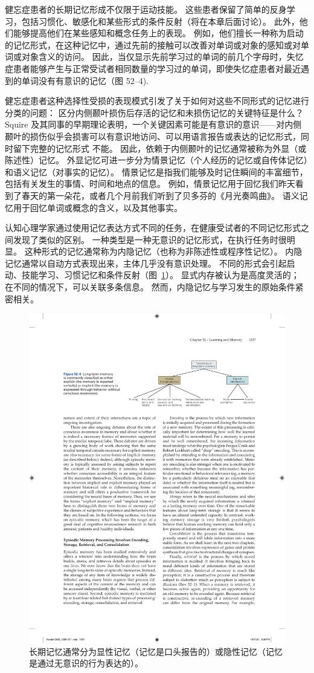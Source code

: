 健忘症患者的长期记忆形成不仅限于运动技能。
这些患者保留了简单的反身学习，包括习惯化、敏感化和某些形式的条件反射（将在本章后面讨论）。
此外，他们能够提高他们在某些感知和概念任务上的表现。
例如，他们擅长一种称为启动的记忆形式，在这种记忆中，通过先前的接触可以改善对单词或对象的感知或对单词或对象含义的访问。
因此，当仅显示先前学习过的单词的前几个字母时，失忆症患者能够产生与正常受试者相同数量的学习过的单词，即使失忆症患者对最近遇到的单词没有有意识的记忆（图 52–4).


健忘症患者这种选择性受损的表现模式引发了关于如何对这些不同形式的记忆进行分类的问题：
区分内侧颞叶损伤后存活的记忆和未损伤记忆的关键特征是什么？
Squire 及其同事的早期理论表明，一个关键因素可能是有意识的意识——对内侧颞叶的损伤似乎会损害可以有意识地访问、可以用语言报告或表达的记忆形式，同时留下完整的记忆形式 不能。
因此，依赖于内侧颞叶的记忆通常被称为外显（或陈述性）记忆。
外显记忆可进一步分为情景记忆（个人经历的记忆或自传体记忆）和语义记忆（对事实的记忆）。
情景记忆是指我们能够及时记住瞬间的丰富细节，包括有关发生的事情、时间和地点的信息。
例如，情景记忆用于回忆我们昨天看到了春天的第一朵花，或者几个月前我们听到了贝多芬的《月光奏鸣曲》。
语义记忆用于回忆单词或概念的含义，以及其他事实。


认知心理学家通过使用记忆表达方式不同的任务，在健康受试者的不同记忆形式之间发现了类似的区别。
一种类型是一种无意识的记忆形式，在执行任务时很明显。
这种形式的记忆通常称为内隐记忆（也称为非陈述性或程序性记忆）。
内隐记忆通常以自动方式表现出来，主体几乎没有意识处理。
不同的形式会引起启动、技能学习、习惯记忆和条件反射（图~\ref{fig:52_5}）。
显式内存被认为是高度灵活的；
在不同的情况下，可以关联多条信息。
然而，内隐记忆与学习发生的原始条件紧密相关。


\begin{figure}[htbp]
	\centering
	\includegraphics[width=0.7\linewidth]{chap52/fig_52_5}
	\caption{长期记忆通常分为显性记忆（记忆是口头报告的）或隐性记忆（记忆是通过无意识的行为表达的）。}
	\label{fig:52_5}
\end{figure}


